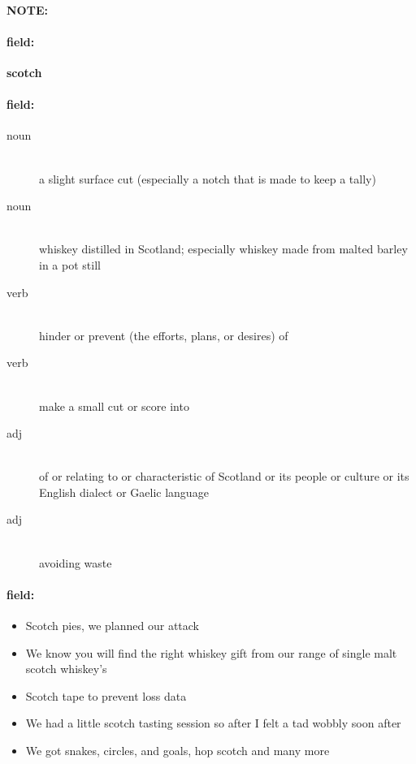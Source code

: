 \documentclass[12pt]{article}
\newenvironment{note}{\paragraph{NOTE:}}{}
\newenvironment{field}{\paragraph{field:}}{}
\begin{document}
\begin{note}
\begin{field}
\textbf{\large scotch}
\end{field}


\begin{field}
\begin{description}
\item[noun] \hfill \\ 
a slight surface cut (especially a notch that is made to keep a tally)

\item[noun] \hfill \\ 
whiskey distilled in Scotland; especially whiskey made from malted barley in a pot still

\item[verb] \hfill \\ 
hinder or prevent (the efforts, plans, or desires) of

\item[verb] \hfill \\ 
make a small cut or score into

\item[adj] \hfill \\ 
of or relating to or characteristic of Scotland or its people or culture or its English dialect or Gaelic language

\item[adj] \hfill \\ 
avoiding waste

\end{description}
\end{field}

\begin{field}
\begin{itemize}
\item Scotch pies, we planned our attack
\item We know you will find the right whiskey gift from our range of single malt scotch whiskey's
\item Scotch tape to prevent loss data
\item We had a little scotch tasting session so after I felt a tad wobbly soon after
\item We got snakes, circles, and goals, hop scotch and many more
\end{itemize}
\end{field}
\end{note}
\end{document}
